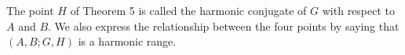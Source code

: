 The point $H$ of Theorem 5 is called the harmonic conjugate of $G$ with respect to $A$ and $B$. We also express the relationship between the four points by saying that $(A, B; G, H)$ is a harmonic range.
